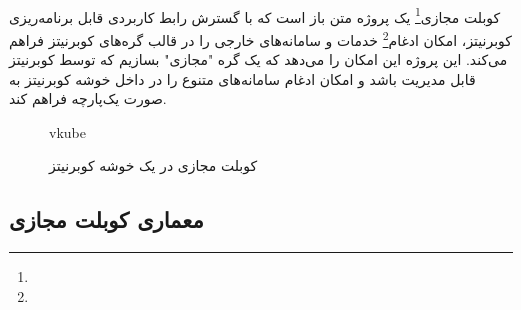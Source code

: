 \paragraph{}
{
    کوبلت مجازی\footnote{}  یک پروژه متن باز است که با گسترش رابط‌ کاربردی قابل برنامه‌ریزی کوبرنیتز، امکان ادغام\footnote{} خدمات و سامانه‌های خارجی را در قالب گره‌های کوبرنیتز فراهم می‌کند. این پروژه این امکان را می‌دهد که یک گره "مجازی" بسازیم که توسط کوبرنیتز قابل مدیریت باشد و امکان ادغام سامانه‌های متنوع را در داخل خوشه کوبرنیتز به صورت یک‌پارچه فراهم کند.    
    \begin{figure}[H]
     \caption{کوبلت مجازی در یک خوشه کوبرنیتز}
     \label{fig:virtkublet_arch}vkube
    \end{figure}
}

\subsection{معماری کوبلت مجازی}
\label{subsec:vkube_arch}
